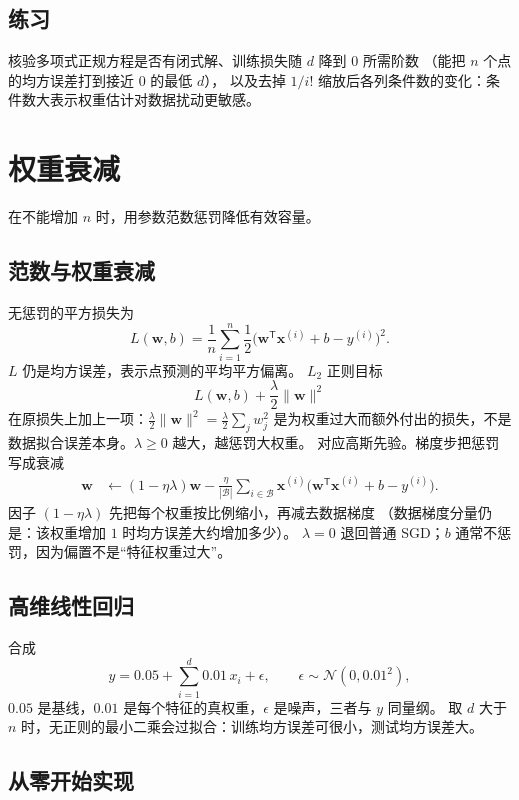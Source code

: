 \subsection{练习}

核验多项式正规方程是否有闭式解、训练损失随 $d$ 降到 $0$ 所需阶数
（能把 $n$ 个点的均方误差打到接近 $0$ 的最低 $d$），
以及去掉 $1/i!$ 缩放后各列条件数的变化：条件数大表示权重估计对数据扰动更敏感。

\section{权重衰减}

在不能增加 $n$ 时，用参数范数惩罚降低有效容量。

\subsection{范数与权重衰减}

无惩罚的平方损失为
\[
L(\bm{w},b)
=
\frac{1}{n}\sum_{i=1}^{n}\frac{1}{2}\bigl(\bm{w}^{\mathsf T}\bm{x}^{(i)}+b-y^{(i)}\bigr)^{2}.
\]
$L$ 仍是均方误差，表示点预测的平均平方偏离。
$L_{2}$ 正则目标
\[
L(\bm{w},b)+\frac{\lambda}{2}\|\bm{w}\|^{2}
\]
在原损失上加上一项：$\frac{\lambda}{2}\|\bm{w}\|^{2}=\frac{\lambda}{2}\sum_j w_j^2$
是为权重过大而额外付出的损失，不是数据拟合误差本身。$\lambda\ge 0$ 越大，越惩罚大权重。
对应高斯先验。梯度步把惩罚写成衰减
\begin{align*}
\bm{w}
&\leftarrow
(1-\eta\lambda)\bm{w}
-
\frac{\eta}{|\mathcal{B}|}
\sum_{i\in\mathcal{B}}
\bm{x}^{(i)}\bigl(\bm{w}^{\mathsf T}\bm{x}^{(i)}+b-y^{(i)}\bigr).
\end{align*}
因子 $(1-\eta\lambda)$ 先把每个权重按比例缩小，再减去数据梯度
（数据梯度分量仍是：该权重增加 $1$ 时均方误差大约增加多少）。
$\lambda=0$ 退回普通 SGD；$b$ 通常不惩罚，因为偏置不是“特征权重过大”。

\subsection{高维线性回归}

合成
\[
y=0.05+\sum_{i=1}^{d}0.01\,x_{i}+\epsilon,
\qquad
\epsilon\sim\mathcal{N}(0,0.01^{2}),
\]
$0.05$ 是基线，$0.01$ 是每个特征的真权重，$\epsilon$ 是噪声，三者与 $y$ 同量纲。
取 $d$ 大于 $n$ 时，无正则的最小二乘会过拟合：训练均方误差可很小，测试均方误差大。

\subsection{从零开始实现}

